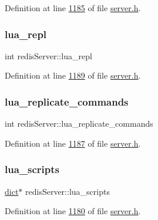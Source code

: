 Definition at line \hyperlink{server_8h_source_l01185}{1185} of file \hyperlink{server_8h_source}{server.\+h}.

\mbox{\label{structredisServer_a9b167779daff45f2c6fd0aa0ed8ce963}} 
\subsubsection{\texorpdfstring{lua\+\_\+repl}{lua\_repl}}
{\footnotesize\ttfamily int redis\+Server\+::lua\+\_\+repl}



Definition at line \hyperlink{server_8h_source_l01189}{1189} of file \hyperlink{server_8h_source}{server.\+h}.

\mbox{\label{structredisServer_ae373654cfd863eb42ad2068b56c25894}} 
\subsubsection{\texorpdfstring{lua\+\_\+replicate\+\_\+commands}{lua\_replicate\_commands}}
{\footnotesize\ttfamily int redis\+Server\+::lua\+\_\+replicate\+\_\+commands}



Definition at line \hyperlink{server_8h_source_l01187}{1187} of file \hyperlink{server_8h_source}{server.\+h}.

\mbox{\label{structredisServer_a349e3196ab321f2c12681d6a66a418d3}} 
\subsubsection{\texorpdfstring{lua\+\_\+scripts}{lua\_scripts}}
{\footnotesize\ttfamily \hyperlink{structdict}{dict}$\ast$ redis\+Server\+::lua\+\_\+scripts}



Definition at line \hyperlink{server_8h_source_l01180}{1180} of file \hyperlink{server_8h_source}{server.\+h}.

